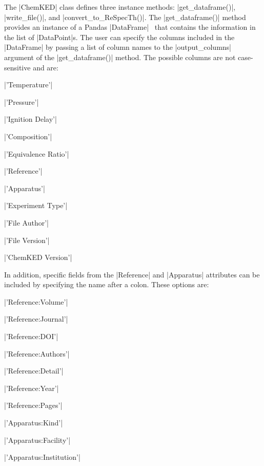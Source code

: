 \documentclass[12pt]{ijck}
\begin{document}
The \pybox|ChemKED| class defines three instance methods:
\pybox|get_dataframe()|, \pybox|write_file()|, and \pybox|convert_to_ReSpecTh()|.
The \pybox|get_dataframe()| method provides an instance of a
Pandas \pybox|DataFrame|~\autocite{pandas} that contains the information in the
list of \pybox|DataPoint|s. The user can specify the columns included in the
\pybox|DataFrame| by passing a list of column names to the
\pybox|output_columns| argument of the \pybox|get_dataframe()| method. The
possible columns are not case-sensitive and are:
%
\noindent\begin{itemize*}
    \item \pybox|'Temperature'|
    \item \pybox|'Pressure'|
    \item \pybox|'Ignition Delay'|
    \item \pybox|'Composition'|
    \item \pybox|'Equivalence Ratio'|
    \item \pybox|'Reference'|
    \item \pybox|'Apparatus'|
    \item \pybox|'Experiment Type'|
    \item \pybox|'File Author'|
    \item \pybox|'File Version'|
    \item \pybox|'ChemKED Version'|
\end{itemize*}

In addition, specific fields from the \pybox|Reference| and \pybox|Apparatus|
attributes can be included by specifying the name after a colon. These options
are:
%
\noindent\begin{itemize*}
    \item \pybox|'Reference:Volume'|
    \item \pybox|'Reference:Journal'|
    \item \pybox|'Reference:DOI'|
    \item \pybox|'Reference:Authors'|
    \item \pybox|'Reference:Detail'|
    \item \pybox|'Reference:Year'|
    \item \pybox|'Reference:Pages'|
    \item \pybox|'Apparatus:Kind'|
    \item \pybox|'Apparatus:Facility'|
\end{itemize*}

\noindent\begin{itemize*}
    \item \pybox|'Apparatus:Institution'|
\end{itemize*}
\end{document}
